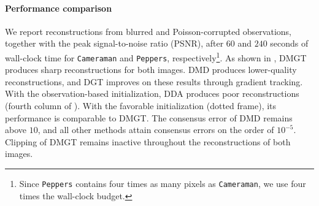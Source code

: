 \documentclass{article}
\theoremstyle{plain}
\theoremstyle{definition}
\theoremstyle{remark}
\begin{document}
\paragraph{Performance comparison} We report reconstructions from blurred and Poisson-corrupted observations, together with the peak signal-to-noise ratio (PSNR), after $60$ and $240$ seconds of wall-clock time for \texttt{Cameraman} and \texttt{Peppers}, respectively\footnote{Since \texttt{Peppers} contains four times as many pixels as \texttt{Cameraman}, we use four times the wall-clock budget.}. 
As shown in , {\sf DMGT} produces sharp reconstructions for both images. {\sf DMD} produces lower-quality reconstructions, and {\sf DGT} improves on these results through gradient tracking. With the observation-based initialization, {\sf DDA} produces poor reconstructions (fourth column of ). With the favorable initialization (dotted frame), its performance is comparable to {\sf DMGT}. The consensus error of {\sf DMD} remains above $10$, and all other methods attain consensus errors on the order of $10^{-5}$.  Clipping of {\sf DMGT} remains inactive throughout the reconstructions of both images.



%
%
%
\appendix
\end{document}

